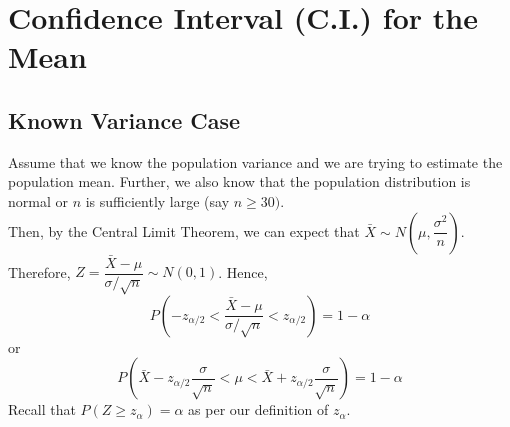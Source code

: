 \section{Confidence Interval (C.I.) for the Mean}
\subsection{Known Variance Case}
Assume that we know the population variance and we are trying to estimate the population mean. Further, we also know that the population distribution is normal or $n$ is sufficiently large (say $n \geq 30)$. \\
Then, by the Central Limit Theorem, we can expect that $\bar{X} \sim N\left(\mu, \dfrac{\sigma^2}{n}\right)$. Therefore, $Z = \dfrac{\bar{X} - \mu }{\sigma/\sqrt{n}} \sim N(0,1)$. Hence,
$$
P\left(-z_{\alpha/2} < \dfrac{\bar{X} - \mu }{\sigma/\sqrt{n}} < z_{\alpha/2}\right) = 1 - \alpha
$$ or
$$
P\left( \bar{X} - z_{\alpha/2}\dfrac{\sigma}{\sqrt{n}} < \mu < \bar{X} + z_{\alpha/2}\dfrac{\sigma}{\sqrt{n}} \right ) = 1 - \alpha
$$
Recall that $P(Z \geq z_{\alpha}) = \alpha$ as per our definition of $z_{\alpha}$. \\
